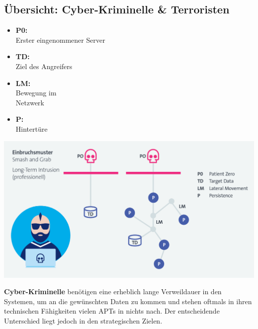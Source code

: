\subsection{Übersicht: Cyber-Kriminelle \& Terroristen}
\begin{minipage}{0.3\linewidth}
    \begin{itemize}
        \item \textbf{P0:}\\ Erster eingenommener Server
        \item \textbf{TD:}\\ Ziel des Angreifers
        \item \textbf{LM:}\\ Bewegung im\\ Netzwerk
        \item \textbf{P:}\\ Hintertüre
    \end{itemize}
\end{minipage}
\begin{minipage}{0.7\linewidth}
    \begin{center}
        \includegraphics[width=\linewidth]{./img/01-cyber_defense/cyber_terrorists}
    \end{center}
\end{minipage}

\textbf{Cyber-Kriminelle} benötigen eine erheblich lange Verweildauer in den Systemen, um an die gewünschten Daten zu kommen und stehen oftmals in ihren technischen Fähigkeiten vielen APTs in nichts nach. Der entscheidende
Unterschied liegt jedoch in den strategischen Zielen.